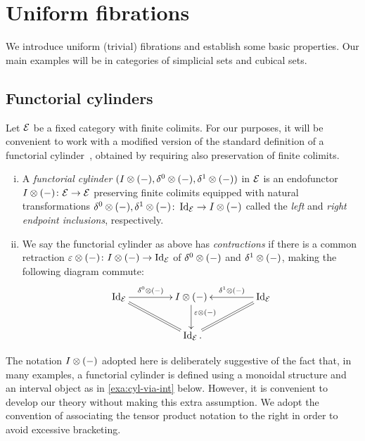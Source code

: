 \documentclass[reqno,10pt,a4paper,oneside,draft]{amsart}
\begin{document}
\section{Uniform fibrations}
\label{sec:unif}

We introduce uniform (trivial) fibrations and establish some basic properties.
Our main examples will be in categories of simplicial sets and cubical sets. 

\subsection*{Functorial cylinders}
Let $\mathcal{E}$ be a fixed category with finite colimits. For our purposes, it will be convenient to 
work with a modified version of the standard definition of a functorial cylinder~\cite{kamps-porter:homotopy}, obtained by requiring also preservation of finite colimits.

\begin{definition} \hfill 
\begin{enumerate}[(i)]
\item A  \emph{functorial cylinder} $(I \otimes (-), \delta^0 \otimes (-), \delta^1 \otimes (-))$ in $\mathcal{E}$ is an endofunctor $I \otimes (-) \colon \mathcal{E} \to \mathcal{E}$ preserving finite colimits
equipped with natural transformations $\delta^0 \otimes (-), \delta^1 \otimes (-) \colon \operatorname{Id}_{\mathcal{E}} \to I \otimes (-)$ called the \emph{left} and \emph{right endpoint inclusions}, respectively.
\item  We say the functorial cylinder as above has \emph{contractions} if there is a common retraction $\varepsilon \otimes (-) \colon I \otimes (-) \to \operatorname{Id}_{\mathcal{E}}$ of $\delta^0 \otimes (-)$ and $\delta^1 \otimes (-)$, making the following diagram commute:
\[
\xymatrix@C+2em{
  \Id_\catE
  \ar[r]^-{\lcyl \otimes (-)}
  \ar@{=}[dr]
&
  \interval \otimes (-)
  \ar[d]^(0.4){\ccyl \otimes (-)}
&
  \Id_\catE
  \ar[l]_-{\rcyl \otimes (-)}
  \ar@{=}[dl]
\\&
  \Id_\catE
\rlap{.}}
\]
\end{enumerate}
\end{definition}

The notation $I \otimes (-)$ adopted here is deliberately suggestive of the fact that, in many examples, a functorial cylinder is defined using a monoidal structure and an interval object as in \cref{exa:cyl-via-int} below.
However, it is convenient to develop our theory without making this extra assumption.
We adopt the convention of associating the tensor product notation to the right in order to avoid excessive bracketing.
\end{document}
